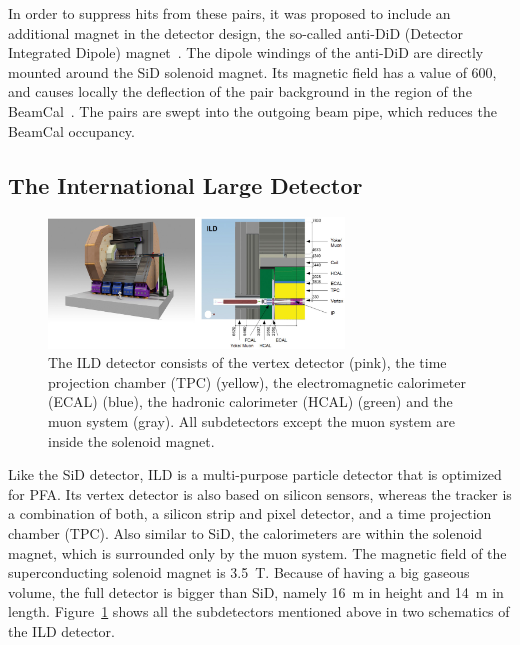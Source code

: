 \begin{itemize}
 In order to suppress hits from these \positron\electron pairs, it was proposed to include an additional magnet in the detector design, the so-called anti-DiD (Detector Integrated Dipole) magnet~\cite{antiDiD}.
 The dipole windings of the anti-DiD are directly mounted around the SiD solenoid magnet.
 Its magnetic field has a value of \SI{600}{\gauss}, and causes locally the deflection of the pair background in the region of the BeamCal~\cite[p. 118]{TDR4}.
 The pairs are swept into the outgoing beam pipe, which reduces the BeamCal occupancy.
\end{itemize}

\subsection{The International Large Detector} 
\begin{figure}[h]
\centering
\includegraphics[width=0.7\textwidth]{Figures/ILD.png}
\caption[Schematic drawing of the ILD detector]{The ILD detector consists of the vertex detector (pink), the time projection chamber (TPC) (yellow), the electromagnetic calorimeter (ECAL) (blue), the hadronic calorimeter (HCAL) (green) and the muon system (gray). All subdetectors except the muon system are inside the solenoid magnet.\cite[p. 34]{TDR1}}
\label{fig:ILD}
\end{figure}
Like the SiD detector, ILD is a multi-purpose particle detector that is optimized for PFA.
Its vertex detector is also based on silicon sensors, whereas the tracker is a combination of both, a silicon strip and pixel detector, and a time projection chamber (TPC).
Also similar to SiD, the calorimeters are within the solenoid magnet, which is surrounded only by the muon system.
The magnetic field of the superconducting solenoid magnet is \SI{3.5}{T}.
Because of having a big gaseous volume, the full detector is bigger than SiD, namely \SI{16}{m} in height and \SI{14}{m} in length.
Figure~\ref{fig:ILD} shows all the subdetectors mentioned above in two schematics of the ILD detector.
